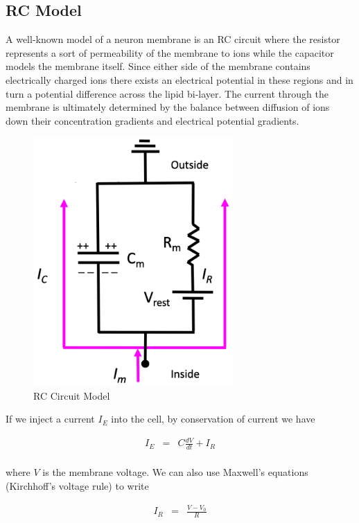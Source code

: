 \documentclass[a4paper,11pt]{book}
\begin{document}
\subsection{RC Model}

A well-known model of a neuron membrane is an RC circuit where the resistor represents a sort of permeability of the membrane to ions while the capacitor models the membrane itself. Since either side of the membrane contains electrically charged ions there exists an electrical potential in these regions and in turn a potential difference across the lipid bi-layer. The current through the membrane is ultimately determined by the balance between diffusion of ions down their concentration gradients and electrical potential gradients. 

\begin{figure}
\centering
  \includegraphics[width=3in]{assets/circuit-model.png}
  \caption{RC Circuit Model}
  \label{fig:circuit}
\end{figure}

If we inject a current $I_{E}$ into the cell, by conservation of current we have

\begin{eqnarray*}
I_{E} &=& C\frac{dV}{dt} + I_{R}\\
\end{eqnarray*}

where $V$ is the membrane voltage. We can also use Maxwell's equations (Kirchhoff's voltage rule) to write

\begin{eqnarray*}
I_{R} &=& \frac{V-V_{0}}{R}\\
\end{eqnarray*}
\end{document}
